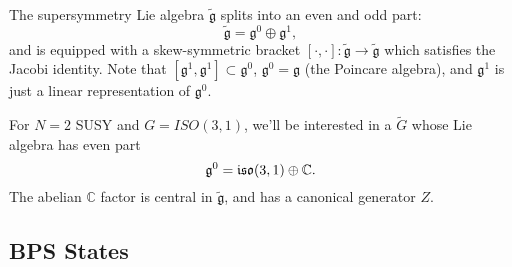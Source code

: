 The supersymmetry Lie algebra $\tilde{\mathfrak{g}}$ splits into
an even and odd part:
\[
\tilde{\mathfrak{g}}=\mathfrak{g}^{0}\oplus\mathfrak{g}^{1},
\]
and is equipped with a skew-symmetric bracket $\left[\cdot,\cdot\right]:\tilde{\mathfrak{g}}\rightarrow\tilde{\mathfrak{g}}$
which satisfies the Jacobi identity. Note that $\left[\mathfrak{g}^{1},\mathfrak{g}^{1}\right]\subset\mathfrak{g}^{0}$,
$\mathfrak{g}^{0}=\mathfrak{g}$ (the Poincare algebra), and $\mathfrak{g}^{1}$
is just a linear representation of $\mathfrak{g}^{0}$.
\begin{example*}
For $N=2$ SUSY and $G=ISO(3,1)$, we'll be interested in a $\tilde{G}$
whose Lie algebra has even part
\[
\mathfrak{g}^{0}=\mbox{\ensuremath{\mathfrak{iso}}}(3,1)\oplus\mathbb{C}.
\]
The abelian $\mathbb{C}$ factor is central in $\tilde{\mathfrak{g}}$,
and has a canonical generator $Z$.
\end{example*}

\subsection{BPS States}

